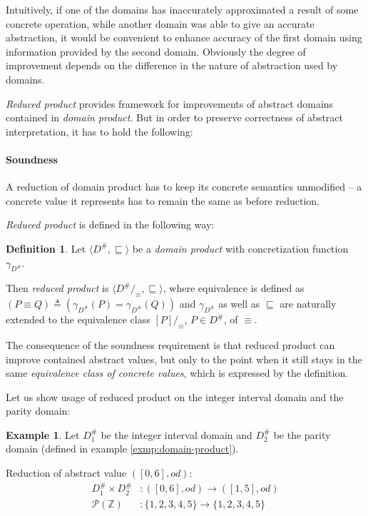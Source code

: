 \documentclass[12pt,oneside]{fithesis2}
\theoremstyle{definition}
\newtheorem{exmp}{Example}[section]
\newtheorem{definition}{Definition}
\begin{document}
Intuitively, if one of the domains has inaccurately approximated a result of some concrete operation, while another domain was able to give an accurate abstraction, it would be convenient to enhance accuracy of the first domain using information provided by the second domain. Obviously the degree of improvement depends on the difference in the nature of abstraction used by domains.

\textit{Reduced product} provides framework for improvements of abstract domains contained in \textit{domain product}. But in order to preserve correctness of abstract interpretation, it has to hold the following:

\paragraph{Soundness}  A reduction of domain product has to keep its concrete semantics unmodified -- a concrete value it represents has to remain the same as before reduction.

\textit{Reduced product} is defined in the following way: \cite{CousotCousotMauborgne-FoSSaCS-11}

\begin{definition}
  Let $\langle D^\#, \sqsubseteq \rangle$ be a \textit{domain product} with concretization function $\gamma_{D^\#}$.

  Then \textit{reduced product} is $\langle D^\# /_\equiv, \sqsubseteq \rangle$, where equivalence is defined as  $\left(P \equiv Q \right) \triangleq \left(\gamma_{D^\#}(P) = \gamma_{D^\#}(Q) \right)$ and $\gamma_{D^\#}$ as well as $\sqsubseteq$ are naturally extended to the equivalence class $[P]/_\equiv$, $P \in D^\#$, of $\equiv$.
\end{definition}

The consequence of the soundness requirement is that reduced product can improve contained abstract values, but only to the point when it still stays in the same \textit{equivalence class of concrete values}, which is expressed by the definition.

Let us show usage of reduced product on the integer interval domain and the parity domain:

\begin{exmp}
  Let $D^\#_1$ be the integer interval domain and $D^\#_2$ be the parity domain (defined in example \ref{exmp:domain-product}).

  Reduction of abstract value $\left( [0,6], od \right)$:
  \begin{align*}
    D^\#_1 \times D^\#_2 &: \left( [0,6], od \right) \to \left([1, 5], od \right)\\
    \mathcal P(\mathbb Z) &: \{1,2,3,4,5\} \to \{1,2,3,4,5\}
  \end{align*}
\end{exmp}
\end{document}
